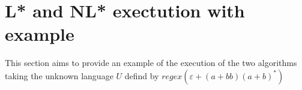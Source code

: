 \section{L* and NL* exectution with example}

This section aims to provide an example of the execution of the two algorithms taking the unknown language $U$ defind by $regex(\varepsilon+(a+bb)(a+b)^*)$ %

